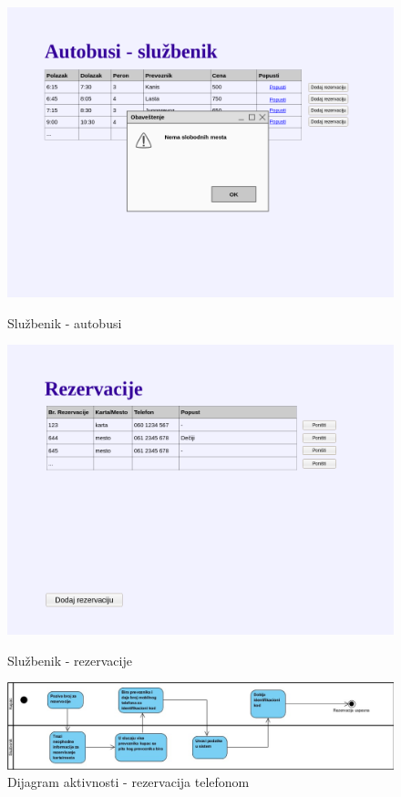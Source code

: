 \begin {figure} [h!tb]
  \centering
  \includegraphics[width=1.2\linewidth]{../Slike/Veb/autobusi_sluzbenik.png}
  \caption {Slu\v zbenik - autobusi}
  \label {fig:sluzbenikautobusi}
\end {figure}
\clearpage
\begin{figure} [h!tb]
  \centering
  \includegraphics[width=1.2\linewidth]{../Slike/Veb/rezervacije.png}
	\caption{Slu\v zbenik - rezervacije}
	
  \label{fig:sluzbenikrezervacije}
	\vspace*{\floatsep}
	
	\includegraphics[width=1.1\linewidth]{../Slike/rezervacijaTelefonom}
	\caption{Dijagram aktivnosti - rezervacija telefonom}
	\label{fig:rezervacijatelefonom}
\end{figure}	

